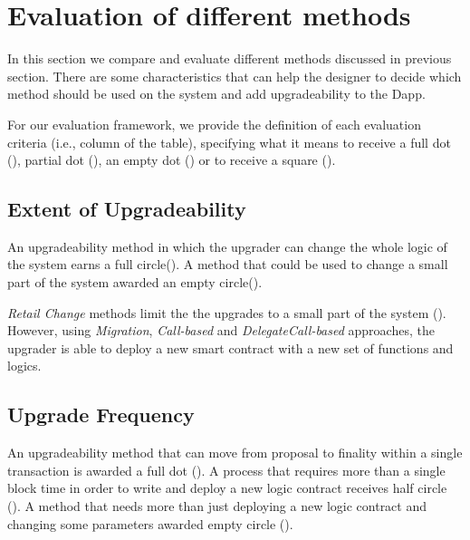  \section{Evaluation of different methods}
 
 In this section we compare and evaluate different methods discussed in previous section. There are some characteristics that can help the designer to decide which method should be used on the system and add upgradeability to the Dapp.

 For our evaluation framework, we provide the definition of each evaluation criteria (i.e., column of the table), specifying what it means to receive a full dot (\CIRCLE), partial dot (\LEFTcircle), an empty dot (\Circle) or to receive a square (\XBox).

 
 \subsection{Extent of Upgradeability}
 An upgradeability method in which the upgrader can change the whole logic of the system earns a full circle(\CIRCLE). A method that could be used to change a small part of the system awarded an empty circle(\Circle).

 \textit{Retail Change} methods limit the the upgrades to a small part of the system (\Circle). However, using \textit{Migration}, \textit{Call-based} and \textit{DelegateCall-based} approaches, the upgrader is able to deploy a new smart contract with a new set of functions and logics.



\subsection{Upgrade Frequency} \label{upgradeFRQ}

An upgradeability method that can move from proposal to finality within a single transaction is awarded a full dot (\CIRCLE). A process that requires more than a single block time in order to write and deploy a new logic contract receives half circle (\LEFTcircle). A method that needs more than just deploying a new logic contract and changing some parameters awarded empty circle (\Circle).

